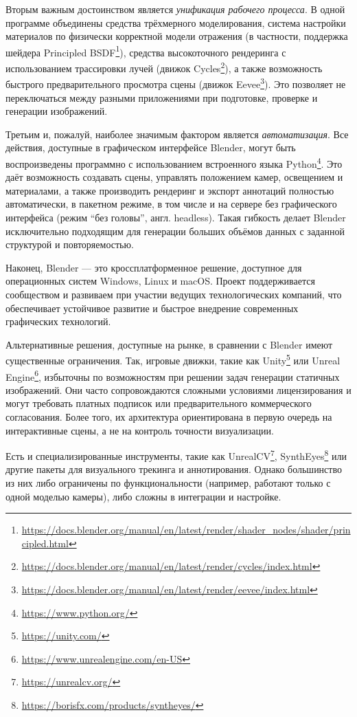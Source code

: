 Вторым важным достоинством является \emph{унификация рабочего процесса}. В одной
программе объединены средства трёхмерного моделирования, система настройки
материалов по физически корректной модели отражения (в частности, поддержка
шейдера Principled
BSDF\footnote{\url{https://docs.blender.org/manual/en/latest/render/shader_nodes/shader/principled.html}}),
средства высокоточного рендеринга с использованием трассировки лучей (движок
Cycles\footnote{\url{https://docs.blender.org/manual/en/latest/render/cycles/index.html}}),
а также возможность быстрого предварительного просмотра сцены (движок
Eevee\footnote{\url{https://docs.blender.org/manual/en/latest/render/eevee/index.html}}).
Это позволяет не переключаться между разными приложениями при подготовке,
проверке и генерации изображений.

Третьим и, пожалуй, наиболее значимым фактором является \emph{автоматизация}.
Все действия, доступные в графическом интерфейсе Blender, могут быть
воспроизведены программно с использованием встроенного языка
Python\footnote{\url{https://www.python.org/}}. Это даёт возможность создавать
сцены, управлять положением камер, освещением и материалами, а также производить
рендеринг и экспорт аннотаций полностью автоматически, в пакетном режиме, в том
числе и на сервере без графического интерфейса (режим ``без головы'', англ.
headless). Такая гибкость делает Blender исключительно подходящим для генерации
больших объёмов данных с заданной структурой и повторяемостью.

Наконец, Blender — это кроссплатформенное решение, доступное для операционных
систем Windows, Linux и macOS. Проект поддерживается сообществом и развиваем при
участии ведущих технологических компаний, что обеспечивает устойчивое развитие и
быстрое внедрение современных графических технологий.

Альтернативные решения, доступные на рынке, в сравнении с Blender имеют
существенные ограничения. Так, игровые движки, такие как
Unity\footnote{\url{https://unity.com/}} или Unreal
Engine\footnote{\url{https://www.unrealengine.com/en-US}}, избыточны по
возможностям при решении задач генерации статичных изображений. Они часто
сопровождаются сложными условиями лицензирования и могут требовать платных
подписок или предварительного коммерческого согласования.  Более того, их
архитектура ориентирована в первую очередь на интерактивные сцены, а не на
контроль точности визуализации.

Есть и специализированные инструменты, такие как
UnrealCV\footnote{\url{https://unrealcv.org/}},
SynthEyes\footnote{\url{https://borisfx.com/products/syntheyes/}} или другие
пакеты для визуального трекинга и аннотирования. Однако большинство из них либо
ограничены по функциональности (например, работают только с одной моделью
камеры), либо сложны в интеграции и настройке.


